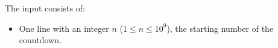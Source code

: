 
  The input consists of:
  \begin{itemize}
    \item One line with an integer $n$ ($1 \le n \le 10^9$), the starting number of the countdown.
  \end{itemize}
